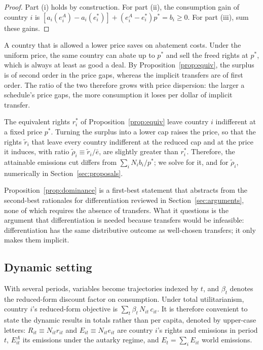 \documentclass[12pt,english]{article}
\theoremstyle{remark}
\begin{document}
\begin{proof}
Part (i) holds by construction. For part (ii), the consumption gain of country $i$ is $[a_i(e^A_i)-a_i(e^*_i)]+(e^A_i-e^*_i)p^*=b_i\geq0$. For part (iii), sum these gains.
\end{proof}

A country that is allowed a lower price saves on abatement costs.
Under the uniform price, the same country can abate up to $p^*$ and sell the freed rights at $p^*$, which is always at least as good a deal. By Proposition~\ref{prop:equiv}, the surplus is of second order in the price gaps, whereas the implicit transfers are of first order. The ratio of the two therefore grows with price dispersion: the larger a schedule's price gaps, the more consumption it loses per dollar of implicit transfer.

The equivalent rights $r^*_i$ of Proposition~\ref{prop:equiv} leave country $i$ indifferent at a fixed price $p^*$. Turning the surplus into a lower cap raises the price, so that the rights $\tilde r_i$ that leave every country indifferent at the reduced cap and at the price it induces, with ratio $\tilde\rho_i\equiv\tilde r_i/\bar e$, are slightly greater than $r^*_i$. Therefore, the attainable emissions cut differs from $\sum_i N_i b_i/p^*$; we solve for it, and for $\tilde\rho_i$, numerically in Section~\ref{sec:proposals}.

Proposition~\ref{prop:dominance} is a first-best statement that abstracts from the second-best rationales for differentiation reviewed in Section~\ref{sec:arguments}, none of which requires the absence of transfers.
What it questions is the argument that differentiation is needed because transfers would be infeasible: differentiation has the same distributive outcome as well-chosen transfers; it only makes them implicit.

\subsection{Dynamic setting}
\label{sec:dynamic}

With several periods, variables become trajectories indexed by $t$, and $\beta_t$ denotes the reduced-form discount factor on consumption. Under total utilitarianism, country $i$'s reduced-form objective is $\sum_t \beta_t\,N_{it}\,c_{it}$.
It is therefore convenient to state the dynamic results in totals rather than per capita, denoted by upper-case letters: $R_{it}\equiv N_{it}r_{it}$ and $E_{it}\equiv N_{it}e_{it}$ are country $i$'s rights and emissions in period $t$, $E^A_{it}$ its emissions under the autarky regime, and $E_t=\sum_i E_{it}$ world emissions.
\end{document}
